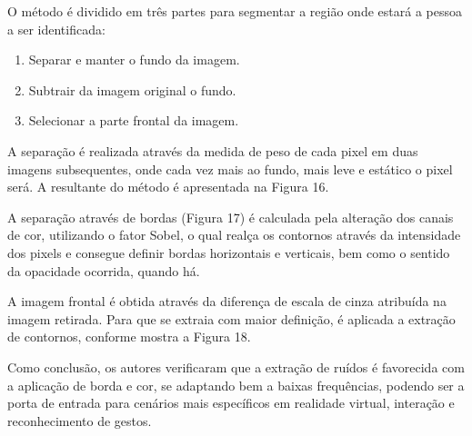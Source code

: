 \documentclass[12pt,oneside,a4paper,chapter=TITLE,section=TITLE,sumario=tradicional]{abntex2}
\begin{document}
\begin{figure}[htb]
\end{figure}

O método é dividido em três partes para segmentar a região onde estará a pessoa a ser identificada:
\begin{enumerate}
    \item Separar e manter o fundo da imagem.
    \item Subtrair da imagem original o fundo.
    \item Selecionar a parte frontal da imagem.
\end{enumerate}

A separação é realizada através da medida de peso de cada pixel em duas imagens subsequentes, onde cada vez mais ao fundo, mais leve e estático o pixel será. A resultante do método é apresentada na Figura 16.

\begin{figure}[htb]
\end{figure}

A separação através de bordas (Figura 17) é calculada pela alteração dos canais de cor, utilizando o fator Sobel, o qual realça os contornos através da intensidade dos pixels e consegue definir bordas horizontais e verticais, bem como o sentido da opacidade ocorrida, quando há.

\begin{figure}[htb]
\end{figure}

A imagem frontal é obtida através da diferença de escala de cinza atribuída na imagem retirada. Para que se extraia com maior definição, é aplicada a extração de contornos, conforme mostra a Figura 18.

\begin{figure}[htb]
\end{figure}

Como conclusão, os autores verificaram que a extração de ruídos é favorecida com a aplicação de borda e cor, se adaptando bem a baixas frequências, podendo ser a porta de entrada para cenários mais específicos em realidade virtual, interação e reconhecimento de gestos.
\end{document}

